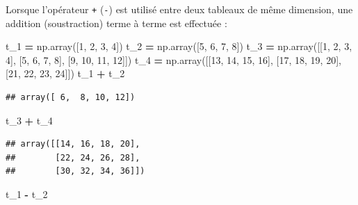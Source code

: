 \documentclass[
  12pt,
]{book}
\newenvironment{Shaded}{\begin{snugshade}}{\end{snugshade}}
\newcommand{\DecValTok}[1]{\textcolor[rgb]{0.00,0.00,0.81}{#1}}
\newcommand{\NormalTok}[1]{#1}
\newcommand{\OperatorTok}[1]{\textcolor[rgb]{0.81,0.36,0.00}{\textbf{#1}}}
\numberwithin{equation}{section}
\numberwithin{countremarque}{section}
\begin{document}
Lorsque l'opérateur \texttt{+} (\texttt{-}) est utilisé entre deux tableaux de même dimension, une addition (soustraction) terme à terme est effectuée :

\begin{Shaded}
\begin{Highlighting}[]
\NormalTok{t\_1 }\OperatorTok{=}\NormalTok{ np.array([}\DecValTok{1}\NormalTok{, }\DecValTok{2}\NormalTok{, }\DecValTok{3}\NormalTok{, }\DecValTok{4}\NormalTok{])}
\NormalTok{t\_2 }\OperatorTok{=}\NormalTok{ np.array([}\DecValTok{5}\NormalTok{, }\DecValTok{6}\NormalTok{, }\DecValTok{7}\NormalTok{, }\DecValTok{8}\NormalTok{])}
\NormalTok{t\_3 }\OperatorTok{=}\NormalTok{ np.array([[}\DecValTok{1}\NormalTok{, }\DecValTok{2}\NormalTok{, }\DecValTok{3}\NormalTok{, }\DecValTok{4}\NormalTok{], [}\DecValTok{5}\NormalTok{, }\DecValTok{6}\NormalTok{, }\DecValTok{7}\NormalTok{, }\DecValTok{8}\NormalTok{], [}\DecValTok{9}\NormalTok{, }\DecValTok{10}\NormalTok{, }\DecValTok{11}\NormalTok{, }\DecValTok{12}\NormalTok{]])}
\NormalTok{t\_4 }\OperatorTok{=}\NormalTok{ np.array([[}\DecValTok{13}\NormalTok{, }\DecValTok{14}\NormalTok{, }\DecValTok{15}\NormalTok{, }\DecValTok{16}\NormalTok{], [}\DecValTok{17}\NormalTok{, }\DecValTok{18}\NormalTok{, }\DecValTok{19}\NormalTok{, }\DecValTok{20}\NormalTok{], [}\DecValTok{21}\NormalTok{, }\DecValTok{22}\NormalTok{, }\DecValTok{23}\NormalTok{, }\DecValTok{24}\NormalTok{]])}
\NormalTok{t\_1 }\OperatorTok{+}\NormalTok{ t\_2}
\end{Highlighting}
\end{Shaded}

\begin{lstlisting}
## array([ 6,  8, 10, 12])
\end{lstlisting}

\begin{Shaded}
\begin{Highlighting}[]
\NormalTok{t\_3 }\OperatorTok{+}\NormalTok{ t\_4}
\end{Highlighting}
\end{Shaded}

\begin{lstlisting}
## array([[14, 16, 18, 20],
##        [22, 24, 26, 28],
##        [30, 32, 34, 36]])
\end{lstlisting}

\begin{Shaded}
\begin{Highlighting}[]
\NormalTok{t\_1 }\OperatorTok{{-}}\NormalTok{ t\_2}
\end{Highlighting}
\end{Shaded}
\end{document}
